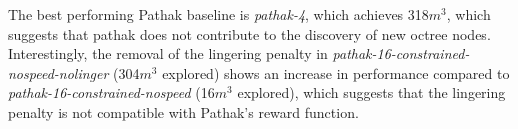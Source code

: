          
        
        
        The best performing Pathak baseline is \textit{pathak-4}, which achieves 318$m^3$, which suggests that pathak does not contribute to the discovery of new octree nodes. 
        Interestingly, the removal of the lingering penalty in \textit{pathak-16-constrained-nospeed-nolinger} (304$m^3$ explored) shows an increase in performance compared to \textit{pathak-16-constrained-nospeed} (16$m^3$ explored), which suggests that the lingering penalty is not compatible with Pathak's reward function.
        
        
        
        
        
            
